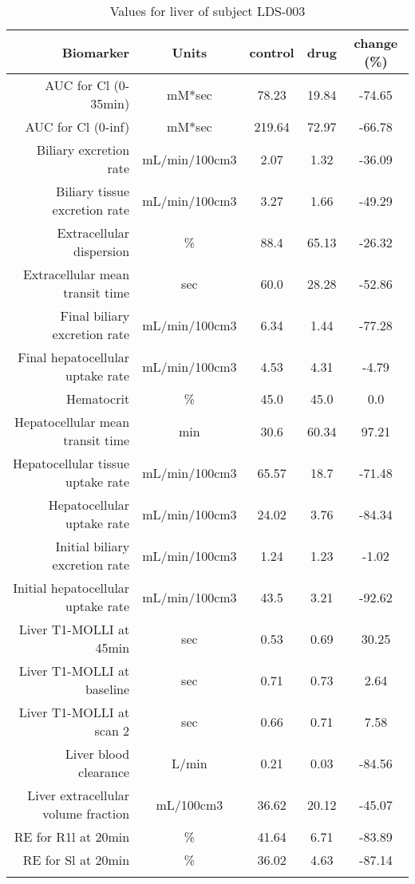 \documentclass{epflreport}%
\begin{document}
%
\clearpage%
\begin{longtable}{rcccc}%
\hline%
Biomarker&Units&control&drug&change (\%)\\%
\hline%
AUC for Cl (0{-}35min)&mM*sec&78.23&19.84&{-}74.65\\%
AUC for Cl (0{-}inf)&mM*sec&219.64&72.97&{-}66.78\\%
Biliary excretion rate&mL/min/100cm3&2.07&1.32&{-}36.09\\%
Biliary tissue excretion rate&mL/min/100cm3&3.27&1.66&{-}49.29\\%
Extracellular dispersion&\%&88.4&65.13&{-}26.32\\%
Extracellular mean transit time&sec&60.0&28.28&{-}52.86\\%
Final biliary excretion rate&mL/min/100cm3&6.34&1.44&{-}77.28\\%
Final hepatocellular uptake rate&mL/min/100cm3&4.53&4.31&{-}4.79\\%
Hematocrit&\%&45.0&45.0&0.0\\%
Hepatocellular mean transit time&min&30.6&60.34&97.21\\%
Hepatocellular tissue uptake rate&mL/min/100cm3&65.57&18.7&{-}71.48\\%
Hepatocellular uptake rate&mL/min/100cm3&24.02&3.76&{-}84.34\\%
Initial biliary excretion rate&mL/min/100cm3&1.24&1.23&{-}1.02\\%
Initial hepatocellular uptake rate&mL/min/100cm3&43.5&3.21&{-}92.62\\%
Liver T1{-}MOLLI at 45min&sec&0.53&0.69&30.25\\%
Liver T1{-}MOLLI at baseline&sec&0.71&0.73&2.64\\%
Liver T1{-}MOLLI at scan 2&sec&0.66&0.71&7.58\\%
Liver blood clearance&L/min&0.21&0.03&{-}84.56\\%
Liver extracellular volume fraction&mL/100cm3&36.62&20.12&{-}45.07\\%
RE for R1l at 20min&\%&41.64&6.71&{-}83.89\\%
RE for Sl at 20min&\%&36.02&4.63&{-}87.14\\%
\hline%
\caption{Values for liver of subject LDS-003} \\%
\end{longtable}%
\end{document}
